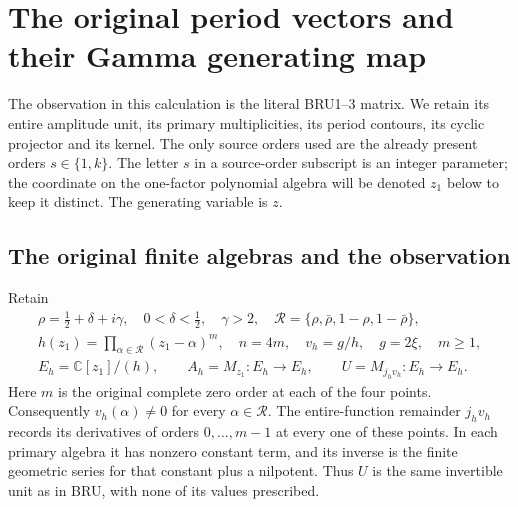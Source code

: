 \documentclass[11pt,a4paper]{article}
\begin{document}
\section{The original period vectors and their Gamma generating map}
\label{sec:OPG}

The observation in this calculation is the literal BRU1--3 matrix. We
retain its entire amplitude unit, its primary multiplicities, its
period contours, its cyclic projector and its kernel. The only source
orders used are the already present orders $s\in\{1,k\}$. The letter
$s$ in a source-order subscript is an integer parameter; the coordinate
on the one-factor polynomial algebra will be denoted $z_1$ below to
keep it distinct. The generating variable is $z$.

\subsection{The original finite algebras and the observation}
Retain
\[
\begin{gathered}
 \rho=\tfrac12+\delta+i\gamma,\quad 0<\delta<\tfrac12,\quad\gamma>2,
 \quad\mathcal R=\{\rho,\bar\rho,1-\rho,1-\bar\rho\},\\
 h(z_1)=\prod_{\alpha\in\mathcal R}(z_1-\alpha)^m,
 \quad n=4m,\quad v_h=g/h,\quad g=2\xi,\quad m\geq1,\\
 E_h=\mathbb C[z_1]/(h),\qquad A_h=M_{z_1}:E_h\to E_h,
 \qquad U=M_{j_hv_h}:E_h\to E_h.
\end{gathered}\tag{OPG1}
\]
Here $m$ is the original complete zero order at each of the four
points. Consequently $v_h(\alpha)\ne0$ for every $\alpha\in\mathcal R$.
The entire-function remainder $j_hv_h$ records its derivatives of
orders $0,\ldots,m-1$ at every one of these points. In each primary
algebra it has nonzero constant term, and its inverse is the finite
geometric series for that constant plus a nilpotent. Thus $U$ is the
same invertible unit as in BRU, with none of its values prescribed.
\end{document}
